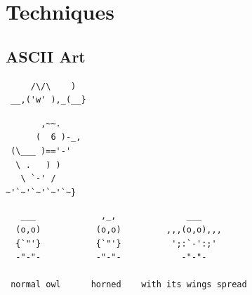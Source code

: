 \chapter{Techniques}
\section{ASCII Art}
\begin{verbatim}
     /\/\    )
 __,('w' ),_(__}
\end{verbatim}
\begin{verbatim}
       ,~~.
      (  6 )-_,
 (\___ )=='-'
  \ .   ) )
   \ `-' /   
~'`~'`~'`~'`~}
\end{verbatim}
\begin{verbatim}
   ___             ,_,              ___
  (o,o)           (o,o)         ,,,(o,o),,,
  {`"'}           {`"'}          ';:`-':;'
  -"-"-           -"-"-            -"-"-
 
 normal owl      horned    with its wings spread
\end{verbatim}



